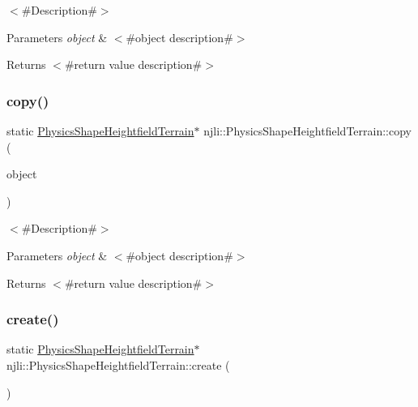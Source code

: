$<$\#\+Description\#$>$


\begin{DoxyParams}{Parameters}
{\em object} & $<$\#object description\#$>$\\
\hline
\end{DoxyParams}
\begin{DoxyReturn}{Returns}
$<$\#return value description\#$>$ 
\end{DoxyReturn}
\mbox{\label{classnjli_1_1_physics_shape_heightfield_terrain_a090478c6886514727ac2462f2f7ff6c3}} 
\subsubsection{\texorpdfstring{copy()}{copy()}}
{\footnotesize\ttfamily static \mbox{\hyperlink{classnjli_1_1_physics_shape_heightfield_terrain}{Physics\+Shape\+Heightfield\+Terrain}}$\ast$ njli\+::\+Physics\+Shape\+Heightfield\+Terrain\+::copy (\begin{DoxyParamCaption}\item[{const \mbox{\hyperlink{classnjli_1_1_physics_shape_heightfield_terrain}{Physics\+Shape\+Heightfield\+Terrain}} \&}]{object }\end{DoxyParamCaption})\hspace{0.3cm}{\ttfamily [static]}}

$<$\#\+Description\#$>$


\begin{DoxyParams}{Parameters}
{\em object} & $<$\#object description\#$>$\\
\hline
\end{DoxyParams}
\begin{DoxyReturn}{Returns}
$<$\#return value description\#$>$ 
\end{DoxyReturn}
\mbox{\label{classnjli_1_1_physics_shape_heightfield_terrain_a99221bc00751a5b39af56a9500b40e5c}} 
\subsubsection{\texorpdfstring{create()}{create()}\hspace{0.1cm}{\footnotesize\ttfamily [1/2]}}
{\footnotesize\ttfamily static \mbox{\hyperlink{classnjli_1_1_physics_shape_heightfield_terrain}{Physics\+Shape\+Heightfield\+Terrain}}$\ast$ njli\+::\+Physics\+Shape\+Heightfield\+Terrain\+::create (\begin{DoxyParamCaption}{ }\end{DoxyParamCaption})\hspace{0.3cm}{\ttfamily [static]}}

